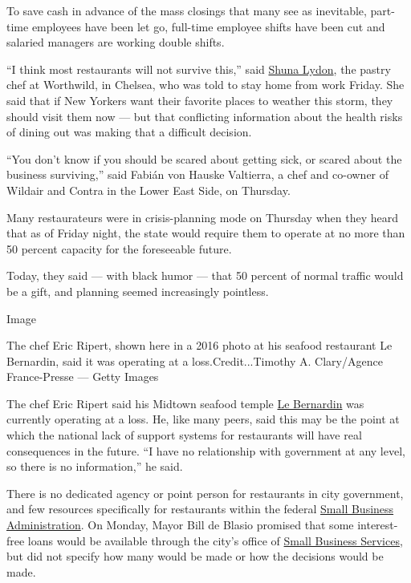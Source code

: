 To save cash in advance of the mass closings that many see as
inevitable, part-time employees have been let go, full-time employee
shifts have been cut and salaried managers are working double shifts.

``I think most restaurants will not survive this,'' said
\href{https://www.nytimes3xbfgragh.onion/2016/07/18/t-magazine/food/shuna-lydon-robert-rauschenberg-foundation-cook-recipes.html}{Shuna
Lydon}, the pastry chef at Worthwild, in Chelsea, who was told to stay
home from work Friday. She said that if New Yorkers want their favorite
places to weather this storm, they should visit them now --- but that
conflicting information about the health risks of dining out was making
that a difficult decision.

``You don't know if you should be scared about getting sick, or scared
about the business surviving,'' said Fabián von Hauske Valtierra, a chef
and co-owner of Wildair and Contra in the Lower East Side, on Thursday.

Many restaurateurs were in crisis-planning mode on Thursday when they
heard that as of Friday night, the state would require them to operate
at no more than 50 percent capacity for the foreseeable future.

Today, they said --- with black humor --- that 50 percent of normal
traffic would be a gift, and planning seemed increasingly pointless.

Image

The chef Eric Ripert, shown here in a 2016 photo at his seafood
restaurant Le Bernardin, said it was operating at a
loss.Credit...Timothy A. Clary/Agence France-Presse --- Getty Images

The chef Eric Ripert said his Midtown seafood temple
\href{https://www.nytimes3xbfgragh.onion/2018/06/05/dining/maguy-le-coze-le-bernardin.html}{Le
Bernardin} was currently operating at a loss. He, like many peers, said
this may be the point at which the national lack of support systems for
restaurants will have real consequences in the future. ``I have no
relationship with government at any level, so there is no information,''
he said.

There is no dedicated agency or point person for restaurants in city
government, and few resources specifically for restaurants within the
federal \href{https://www.sba.gov/}{Small Business Administration}. On
Monday, Mayor Bill de Blasio promised that some interest-free loans
would be available through the city's office of
\href{https://www1.nyc.gov/site/sbs/index.page}{Small Business
Services}, but did not specify how many would be made or how the
decisions would be made.

